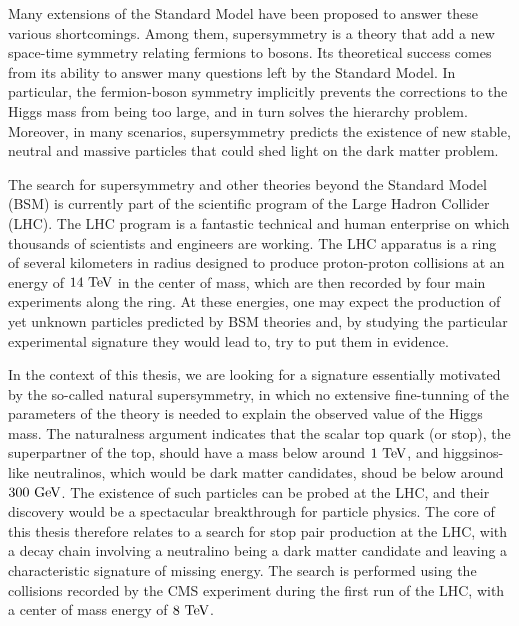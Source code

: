 Many extensions of the Standard Model have been proposed to answer these various shortcomings.
Among them, supersymmetry is a theory that add a new space-time symmetry relating fermions
to bosons. Its theoretical success comes from its ability to answer many questions left by the
Standard Model. In particular, the fermion-boson symmetry implicitly prevents the corrections
to the Higgs mass from being too large, and in turn solves the hierarchy problem.
Moreover, in many scenarios, supersymmetry predicts the existence of new stable, neutral
and massive particles that could shed light on the dark matter problem.

The search for supersymmetry and other theories beyond the Standard Model (BSM) is currently
part of the scientific program of the Large Hadron Collider (LHC). The LHC program is a
fantastic technical and human
enterprise on which thousands of scientists and engineers are working. The LHC apparatus
is a ring of several kilometers in radius designed to produce proton-proton collisions at
an energy of $14~\text{TeV}$ in the center of mass, which are then recorded by four main
experiments along the ring. At these energies, one may expect the production of yet unknown
particles predicted by BSM theories and, by studying the particular experimental signature
they would lead to, try to put them in evidence.

In the context of this thesis, we are looking for a signature essentially motivated by
the so-called natural supersymmetry, in which no extensive fine-tunning of the parameters of
the theory is needed to explain the observed value of the Higgs mass. The naturalness
argument indicates that the scalar top quark (or stop), the superpartner of the top, should have
a mass below around $1~\text{TeV}$, and higgsinos-like neutralinos, which would be dark matter
candidates, shoud be below around $300~\text{GeV}$. The existence of such particles can be probed
at the LHC, and their discovery would be a spectacular breakthrough for particle physics.
The core of this thesis therefore relates to a search for stop pair production at the LHC,
with a decay chain involving a neutralino being a dark matter candidate and leaving a
characteristic signature of missing energy. The search is performed using the
collisions recorded by the CMS experiment during the first run of the LHC, with a center
of mass energy of $8~\text{TeV}$.

